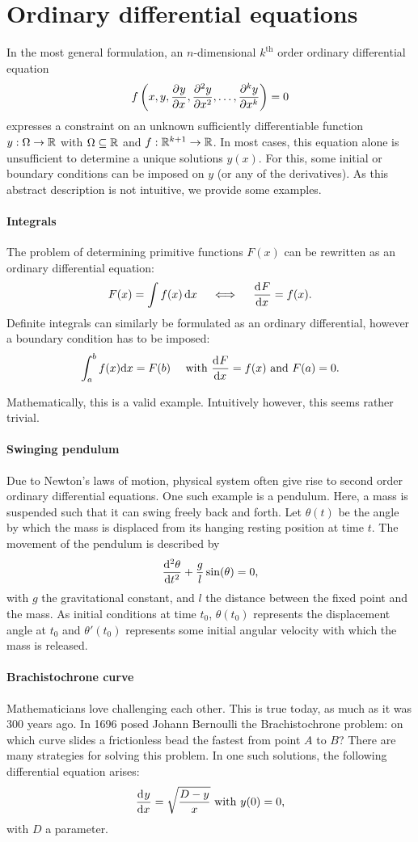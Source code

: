 \section{Ordinary differential equations}

In the most general formulation, an $n$-dimensional $k^\text{th}$ order ordinary differential equation 
$$
f\left(x, y, {\pdv[]{y}{x}}, {\pdv[2]{y}{x}}, \dots, {\pdv[k]{y}{x}}\right) = 0
$$
expresses a constraint on an unknown sufficiently differentiable function $y : \Omega \to \mathbb{R}$ with $\Omega \subseteq \mathbb{R}$ and $f: \mathbb{R}^{k+1} \to \mathbb{R}$. In most cases, this equation alone is unsufficient to determine a unique solutions $y(x)$. For this, some initial or boundary conditions can be imposed on $y$ (or any of the derivatives). As this abstract description is not intuitive, we provide some examples.

\paragraph{Integrals} The problem of determining primitive functions $F(x)$ can be rewritten as an ordinary differential equation:
$$
F(x) = \int f(x) \,\dd x \quad \iff \quad \dv[]{F}{x} = f(x)\text{.}
$$
Definite integrals can similarly be formulated as an ordinary differential, however a boundary condition has to be imposed:
$$
\int_a^b f(x) \dd x = F(b) \quad \text{ with } \dv[]{F}{x} = f(x) \text{ and } F(a) = 0\text{.}
$$

Mathematically, this is a valid example. Intuitively however, this seems rather trivial.

\paragraph{Swinging pendulum} Due to Newton's laws of motion, physical system often give rise to second order ordinary differential equations. One such example is a pendulum. Here, a mass is suspended such that it can swing freely back and forth. Let $\theta(t)$ be the angle by which the mass is displaced from its hanging resting position at time $t$. The movement of the pendulum is described by
$$
\dv[2]{\theta}{t} + \frac{g}{l} \sin(\theta) = 0\text{,}
$$
with $g$ the gravitational constant, and $l$ the distance between the fixed point and the mass. As initial conditions at time $t_0$, $\theta(t_0)$ represents the displacement angle at $t_0$ and $\theta'(t_0)$ represents some initial angular velocity with which the mass is released.

\paragraph{Brachistochrone curve} Mathematicians love challenging each other. This is true today, as much as it was 300 years ago. In 1696 posed Johann Bernoulli the Brachistochrone problem: on which curve slides a frictionless bead the fastest from point $A$ to $B$? There are many strategies for solving this problem. In one such solutions, the following differential equation arises:
$$
{\dv[]{y}{x}} = \sqrt{\frac{D - y}{x}} \text{ with $y(0) = 0$,}
$$
with $D$ a parameter.


